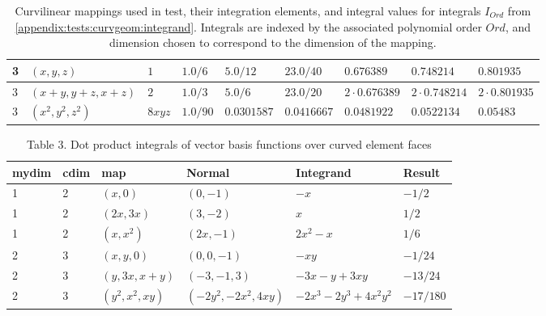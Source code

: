 \begin{landscape}
\begin{table} [H]
\begin{tabular}{ | l | l | l | l | l | l | l | l | l |}
  3 & $(x,y,z)$            & $1$ & $1.0/6$ & $5.0/12$ & $23.0/40$ & $0.676389$ & $0.748214$ & $0.801935$ \\ \hline
  3 & $(x+y,y+z,x+z)$      & $2$ & $1.0/3$ & $5.0/6$ & $23.0/20$ & $2\cdot 0.676389$ & $2\cdot 0.748214$ & $2\cdot 0.801935$ \\ \hline
  3 & $(x^2,y^2,z^2)$      & $8xyz$ & $1.0/90$ & $0.0301587$ & $0.0416667$ & $0.0481922$ & $0.0522134$ & $0.05483$ \\ \hline
\end{tabular} %
\caption{Curvilinear mappings used in \curvgeom{} test, their integration elements, and integral values for integrals $I_{Ord}$ from  \cref{appendix:tests:curvgeom:integrand}. Integrals are indexed by the associated polynomial order $Ord$, and dimension chosen to correspond to the dimension of the mapping.}
\label{appendix:tests:curvgeom:mappings}
\end{table}

\end{landscape}


\begin{table}
\centering
\begin{tabular}{ | l | l | l | l | l | l | }
  \hline
  mydim & cdim & map               & Normal                  & Integrand                  & Result     \\ \hline
  1     & 2    & $(x,0)$           & $(0,-1)$                & $-x$                       & $-1/2$     \\ \hline
  1     & 2    & $(2x,3x)$         & $(3,-2)$                & $x$                        & $1/2$      \\ \hline
  1     & 2    & $(x,x^2)$         & $(2x,-1)$               & $2x^2-x$                   & $1/6$      \\ \hline
  2     & 3    & $(x,y,0)$         & $(0,0,-1)$              & $-xy$                      & $-1/24$    \\ \hline
  2     & 3    & $(y,3x,x+y)$      & $(-3,-1,3)$             & $-3x-y+3xy$                & $-13/24$   \\ \hline
  2     & 3    & $(y^2,x^2,xy)$    & $(-2y^2,-2x^2,4xy)$     & $-2x^3-2y^3+4x^2y^2$      & $-17/180$   \\ \hline
\end{tabular}
\caption{Table 3. Dot product integrals of vector basis functions over curved element faces}
\label{appendix:tests:curvgeom:dotproductintegral}
\end{table}